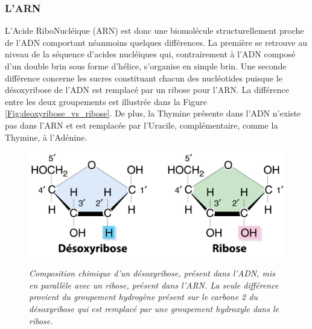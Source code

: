 \subsubsection{L'ARN}

L'Acide RiboNucléique (ARN) est donc une biomolécule structurellement proche de l'ADN comportant néanmoins quelques différences. La première se retrouve au niveau de la séquence d'acides nucléiques qui, contrairement à l'ADN composé d'un double brin sous forme d'hélice, s'organise en simple brin. Une seconde différence concerne les sucres constituant chacun des nucléotides puisque le désoxyribose de l'ADN est remplacé par un ribose pour l'ARN. La différence entre les deux groupements est illustrée dans la Figure \ref{Fig:deoxyribose_vs_ribose}. De plus, la Thymine présente dans l'ADN n'existe pas dans l'ARN et est remplacée par l'Uracile, complémentaire, comme la Thymine, à l'Adénine.

\begin{figure}
  \centering
  {\includegraphics[width=0.8\linewidth]{./figures/ch1/desoxyribose_vs_ribose}}
    \caption{\it Composition chimique d'un désoxyribose, présent dans l'ADN, mis en parallèle avec un ribose, présent dans l'ARN. La seule différence provient du groupement hydrogène présent sur le carbone 2 du désoxyribose qui est remplacé par une groupement hydroxyle dans le ribose.}
    \label{Fig:desoxyribose_vs_ribose}
  \hspace{0.2cm}
\end{figure}


